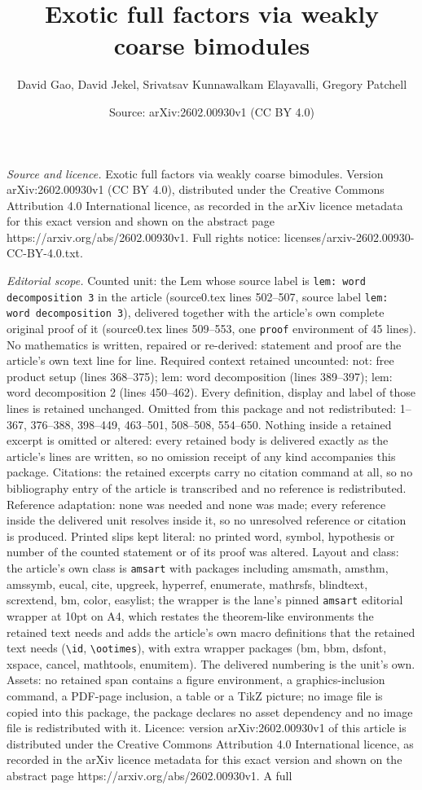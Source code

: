 \documentclass[10pt,a4paper]{amsart}
\title[Exotic full factors via weakly coarse bimodules]{Exotic full factors via weakly coarse bimodules}
\author{David Gao, David Jekel, Srivatsav Kunnawalkam Elayavalli, Gregory Patchell}
\date{Source: arXiv:2602.00930v1 (CC BY 4.0)}
\begin{document}
\maketitle

\noindent\emph{Source and licence.} Exotic full factors via weakly coarse bimodules. Version arXiv:2602.00930v1 (CC BY 4.0), distributed under the Creative Commons Attribution 4.0 International licence, as recorded in the arXiv licence metadata for this exact version and shown on the abstract page https://arxiv.org/abs/2602.00930v1. Full rights notice: licenses/arxiv-2602.00930-CC-BY-4.0.txt.\par\smallskip

\noindent\textit{Editorial scope.} Counted unit: the Lem whose source label is \texttt{lem: word decomposition 3} in the article (source0.tex lines 502--507, source label \texttt{lem: word decomposition 3}), delivered together with the article's own complete original proof of it (source0.tex lines 509--553, one \texttt{proof} environment of 45 lines). No mathematics is written, repaired or re-derived: statement and proof are the article's own text line for line. Required context retained uncounted: not: free product setup (lines 368--375); lem: word decomposition (lines 389--397); lem: word decomposition 2 (lines 450--462). Every definition, display and label of those lines is retained unchanged. Omitted from this package and not redistributed: 1--367, 376--388, 398--449, 463--501, 508--508, 554--650. Nothing inside a retained excerpt is omitted or altered: every retained body is delivered exactly as the article's lines are written, so no omission receipt of any kind accompanies this package. Citations: the retained excerpts carry no citation command at all, so no bibliography entry of the article is transcribed and no reference is redistributed. Reference adaptation: none was needed and none was made; every reference inside the delivered unit resolves inside it, so no unresolved reference or citation is produced. Printed slips kept literal: no printed word, symbol, hypothesis or number of the counted statement or of its proof was altered. Layout and class: the article's own class is \texttt{amsart} with packages including amsmath, amsthm, amssymb, eucal, cite, upgreek, hyperref, enumerate, mathrsfs, blindtext, scrextend, bm, color, easylist; the wrapper is the lane's pinned \texttt{amsart} editorial wrapper at 10pt on A4, which restates the theorem-like environments the retained text needs and adds the article's own macro definitions that the retained text needs (\texttt{\textbackslash id}, \texttt{\textbackslash ootimes}), with extra wrapper packages (bm, bbm, dsfont, xspace, cancel, mathtools, enumitem). The delivered numbering is the unit's own. Assets: no retained span contains a figure environment, a graphics-inclusion command, a PDF-page inclusion, a table or a TikZ picture; no image file is copied into this package, the package declares no asset dependency and no image file is redistributed with it. Licence: version arXiv:2602.00930v1 of this article is distributed under the Creative Commons Attribution 4.0 International licence, as recorded in the arXiv licence metadata for this exact version and shown on the abstract page https://arxiv.org/abs/2602.00930v1. A full 
\end{document}

